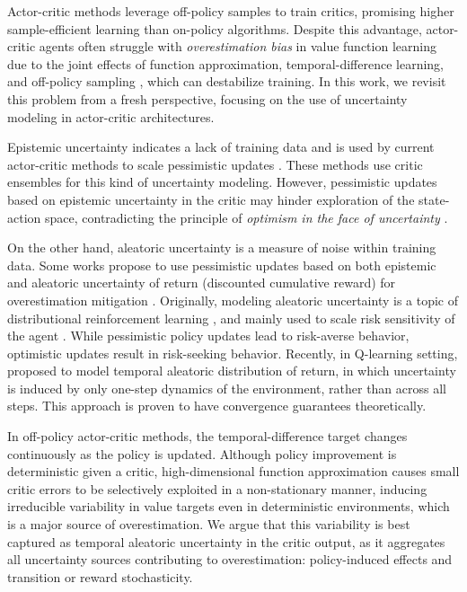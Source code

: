 \documentclass{article}
\begin{document}
Actor-critic methods leverage off-policy samples to train critics, promising higher sample-efficient learning than on-policy algorithms. Despite this advantage, actor-critic agents often struggle with \emph{overestimation bias} in value function learning due to the joint effects of function approximation, temporal-difference learning, and off-policy sampling \citep{thrun2014issues, sutton2018reinforcement, van2018deep}, which can destabilize training. In this work, we revisit this problem from a fresh perspective, focusing on the use of uncertainty modeling in actor-critic architectures. 

Epistemic uncertainty indicates a lack of training data and is used by current actor-critic methods to scale pessimistic updates \citep{fujimoto2018addressing, haarnoja2018soft, kuznetsov2020controlling, moskovitz2021tactical, chen2021randomized, hiraoka2021dropout, zhang2024explorer}. These methods use critic ensembles for this kind of uncertainty modeling. However, pessimistic updates based on epistemic uncertainty in the critic may hinder exploration of the state-action space, contradicting the principle of \textit{optimism in the face of uncertainty} \citep{kocsis2006bandit, audibert2007tuning, azizzadenesheli2018efficient, ciosek2019better, o2023efficient, wu2023uncertainty}.

On the other hand, aleatoric uncertainty is a measure of noise within training data. Some works propose to use pessimistic updates based on both epistemic and aleatoric uncertainty of return (discounted cumulative reward) for overestimation mitigation \citep{kuznetsov2020controlling}. Originally, modeling aleatoric uncertainty is a topic of distributional reinforcement learning \citep{bellemare2017distributional, dabney2018distributional, kim2022efficient, duan2021distributional, duan2025distributional, ma2025dsac}, and mainly used to scale risk sensitivity of the agent \citep{tang2019worst, yang2021wcsac, theate2023risk, ma2025dsac}. While pessimistic policy updates lead to risk-averse behavior, optimistic updates result in risk-seeking behavior. Recently, in Q-learning setting, \citet{achab2023one} proposed to model temporal aleatoric distribution of return, in which uncertainty is induced by only one-step dynamics of the environment, rather than across all steps. This approach is proven to have convergence guarantees theoretically. 

In off-policy actor-critic methods, the temporal-difference target changes continuously as the policy is updated. Although policy improvement is deterministic given a critic, high-dimensional function approximation causes small critic errors to be selectively exploited in a non-stationary manner, inducing irreducible variability in value targets even in deterministic environments, which is a major source of overestimation. We argue that this variability is best captured as temporal aleatoric uncertainty in the critic output, as it aggregates all uncertainty sources contributing to overestimation: policy-induced effects and transition or reward stochasticity.
\end{document}
